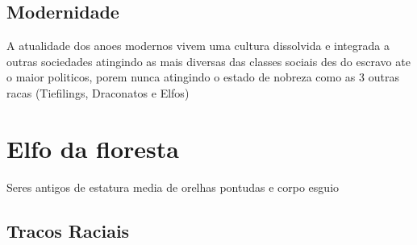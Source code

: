\documentclass{book}
\begin{document}
\section{Modernidade}
A atualidade dos anoes modernos vivem uma cultura dissolvida e integrada a outras sociedades 
atingindo as mais diversas das classes sociais des do escravo ate o maior politicos, porem 
nunca atingindo o estado de nobreza como as 3 outras racas (Tiefilings, Draconatos e Elfos) 

\chapter{Elfo da floresta}
Seres antigos de estatura media de orelhas pontudas e corpo esguio
\section{Tracos Raciais}
\end{document}
